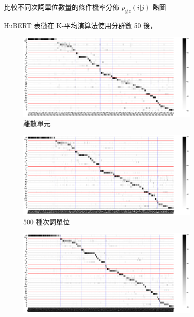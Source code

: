 {{{{\begin{figure}
             \caption{HuBERT 表徵在 K-平均演算法使用分群數 50 後，}
             比較不同次詞單位數量的條件機率分佈 $p_{y|z}(i | j)$ 熱圖
             \label{fig:hub-u050-comparisons}
        \end{figure}
    }
    {
        \newcommand{\tempwidth}[0]{0.8\linewidth}
        \begin{figure}
             \centering
             \begin{subfigure}{\textwidth}
                 \centering
                 \includegraphics[width=\tempwidth]{feasiblefigs/ch4figs/hub-u100-ap0000-givenunit-byphn.png}
                 \caption{離散單元}
                 \label{fig:hub-u100-ap0000-givenunit-byphn}
             \end{subfigure}
             \vfill
             \begin{subfigure}{\textwidth}
                 \centering
                 \includegraphics[width=\tempwidth]{feasiblefigs/ch4figs/hub-u100-ap0500-givenunit-byphn.png}
                 \caption{500 種次詞單位}
                 \label{fig:hub-u100-ap0500-givenunit-byphn}
             \end{subfigure}
             \vfill
             \begin{subfigure}{\textwidth}
                 \centering
                 \includegraphics[width=\tempwidth]{feasiblefigs/ch4figs/hub-u100-ap1000-givenunit-byphn.png}

\end{subfigure}
\end{figure}}}}}
